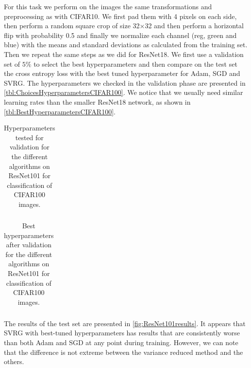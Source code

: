 \documentclass[a4paper,11pt,oneside]{report}
\begin{document}
For this task we perform on the images the same transformations and preprocessing as with CIFAR10. We first pad them with 4 pixels on each side, then perform a random square crop of size 32×32 and then perform a horizontal flip with probability 0.5 and finally we normalize each channel (reg, green and blue) with the means and standard deviations as calculated from the training set. Then we repeat the same steps as we did for ResNet18. We first use a validation set of $5\%$ to select the best hyperparameters and then compare on the test set the cross entropy loss with the best tuned hyperparameter for Adam, SGD and SVRG. The hyperparameters we checked in the validation phase are presented in \autoref{tbl:ChoicesHyperparametersCIFAR100}. We notice that we usually need similar learning rates than the smaller ResNet18 network, as shown in \autoref{tbl:BestHyperparametersCIFAR100}.

\begin{table}
    \begin{center}
        \begin{tabular}{||c | c | l||}
             \hline
             
        \end{tabular}
    \end{center}
    \caption{Hyperparameters tested for validation for the different algorithms on ResNet101 for classification of CIFAR100 images.
    }
    \label{tbl:ChoicesHyperparametersCIFAR100}
\end{table}

\begin{table}
    \begin{center}
        \begin{tabular}{||c | c | l||}
             \hline
             
        \end{tabular}
    \end{center}
    \caption{Best hyperparameters after validation for the different algorithms on ResNet101 for classification of CIFAR100 images.
    }
    \label{tbl:BestHyperparametersCIFAR100}
\end{table}

The results of the test set are presented in \autoref{fig:ResNet101results}. It appears that SVRG with best-tuned hyperparameters has results that are consistently worse than both Adam and SGD at any point during training. However, we can note that the difference is not extreme between the variance reduced method and the others.
\end{document}
